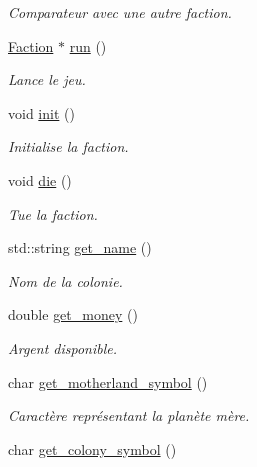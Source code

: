 \begin{DoxyCompactItemize}
\begin{DoxyCompactList}\small\item\em Comparateur avec une autre faction. \end{DoxyCompactList}\item 
\hyperlink{classFaction}{Faction} $\ast$ \hyperlink{classFaction_aa398dcd8f3ca6cf694f69c2de152c538}{run} ()
\begin{DoxyCompactList}\small\item\em Lance le jeu. \end{DoxyCompactList}\item 
void \hyperlink{classFaction_a4f7c37fe385ee3a41e875aa23b6a8319}{init} ()
\begin{DoxyCompactList}\small\item\em Initialise la faction. \end{DoxyCompactList}\item 
void \hyperlink{classFaction_a144860993dcfd384b23da00219ed0b88}{die} ()
\begin{DoxyCompactList}\small\item\em Tue la faction. \end{DoxyCompactList}\item 
\hypertarget{classFaction_ac8ff16ef1f7fa6ba418ae7cf37406170}{std\-::string \hyperlink{classFaction_ac8ff16ef1f7fa6ba418ae7cf37406170}{get\-\_\-name} ()}\label{classFaction_ac8ff16ef1f7fa6ba418ae7cf37406170}

\begin{DoxyCompactList}\small\item\em Nom de la colonie. \end{DoxyCompactList}\item 
\hypertarget{classFaction_a0630bba70db7fc1881a5d0a2c7cac1c6}{double \hyperlink{classFaction_a0630bba70db7fc1881a5d0a2c7cac1c6}{get\-\_\-money} ()}\label{classFaction_a0630bba70db7fc1881a5d0a2c7cac1c6}

\begin{DoxyCompactList}\small\item\em Argent disponible. \end{DoxyCompactList}\item 
\hypertarget{classFaction_ad533ba9bbe8db562be988889553daf14}{char \hyperlink{classFaction_ad533ba9bbe8db562be988889553daf14}{get\-\_\-motherland\-\_\-symbol} ()}\label{classFaction_ad533ba9bbe8db562be988889553daf14}

\begin{DoxyCompactList}\small\item\em Caractère représentant la planète mère. \end{DoxyCompactList}\item 
\hypertarget{classFaction_a72aec7ed1856741ef6ec6cec3049c057}{char \hyperlink{classFaction_a72aec7ed1856741ef6ec6cec3049c057}{get\-\_\-colony\-\_\-symbol} ()}\label{classFaction_a72aec7ed1856741ef6ec6cec3049c057}


\end{DoxyCompactItemize}
